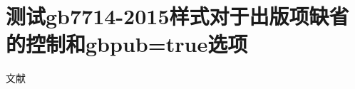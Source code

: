 \documentclass[twoside]{article}
\begin{document}

\section{测试gb7714-2015样式对于出版项缺省的控制和gbpub=true选项}
文献
\cite{Parsons2000noloc--,Parsons2000nopub--,booknolocation,booknopublisher,booknopubitems}
\cite{赵学功2001--,李强2012-05-03--}\cite{裴丽生1981-2-10,Nemec1997-209-214}
\cite{吴云芳2003--,吴云芳2003a--,吴云芳2003b--,吴云芳2003c--}
\cite{中国图书馆学会1957--,中国图书馆学会1957a--,中国图书馆学会1957b--,中国图书馆学会1957c--}

{
\printbibliography%
}
\end{document}
